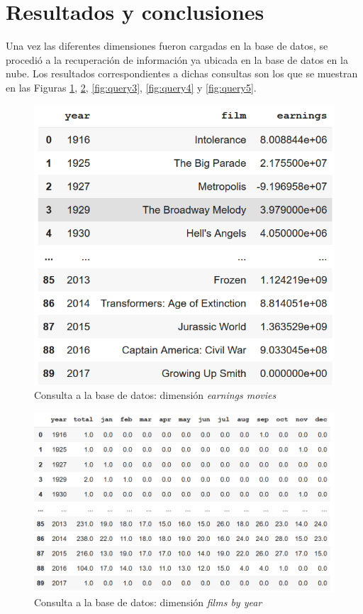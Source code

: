 \documentclass[11pt,a4paper]{article}
\begin{document}
\section{Resultados y conclusiones}

Una vez las diferentes dimensiones fueron cargadas en la base de datos, se procedió a la recuperación de información ya ubicada en la base de datos en la nube. Los resultados correspondientes a dichas consultas son los que se muestran en las Figuras \ref{fig:query1}, \ref{fig:query2}, \ref{fig:query3}, \ref{fig:query4} y \ref{fig:query5}.

	\begin{figure}
		\centering
		\includegraphics[width=0.6\linewidth]{./images/query1.png} 
		\caption{Consulta a la base de datos: dimensión \textit{earnings movies}}
		\label{fig:query1}
	\end{figure}

	\begin{figure}
		\centering
		\includegraphics[width=0.6\linewidth]{./images/query2.png} 
		\caption{Consulta a la base de datos: dimensión \textit{films by year}}
		\label{fig:query2}
	\end{figure}
	
\end{document}
